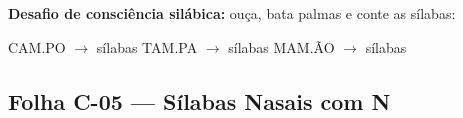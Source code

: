 \begin{somsilaba}[title={\faMusic~Som das S\'ilabas --- B\^onus (n\~ao vale nota)}]
\textbf{Desafio de consci\^encia sil\'abica:} ou\c{c}a, bata palmas e conte as s\'ilabas:
\begin{center}
CAM.PO $\rightarrow$ \underline{\hspace{1cm}} s\'ilabas \quad TAM.PA $\rightarrow$ \underline{\hspace{1cm}} s\'ilabas \quad MAM.\~AO $\rightarrow$ \underline{\hspace{1cm}} s\'ilabas
\end{center}
\end{somsilaba}



\subsection{Folha C-05 --- Sílabas Nasais com N}

